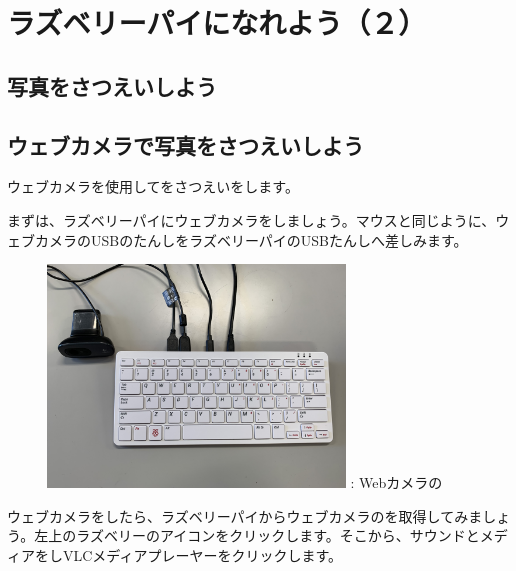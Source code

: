 \documentclass[a4paper,12pt]{jarticle}
\begin{document}
\section[ラズベリーパイになれよう（２）]{ラズベリーパイになれよう（２）}
\subsection{写真をさつえいしよう}
\subsection{\theExercise ウェブカメラで写真をさつえいしよう}
\addtocounter{Exercise}{-1}\label{E:webcam}
ウェブカメラを使用してをさつえいをします。

まずは、ラズベリーパイにウェブカメラをしましょう。マウスと同じように、ウェブカメラのUSBのたんしをラズベリーパイのUSBたんしへ差しみます。



\begin{figure}[ht]
  \centering
  \begin{minipage}{8.528cm}
    {\upshape
      \includegraphics[width=7.904cm]{textbook-img112-2023.jpg}
      \newline
      : Webカメラの}
  \end{minipage}
\end{figure}
ウェブカメラをしたら、ラズベリーパイからウェブカメラのを取得してみましょう。左上のラズベリーのアイコンをクリックします。そこから、サウンドとメディアをしVLCメディアプレーヤーをクリックします。
\end{document}

